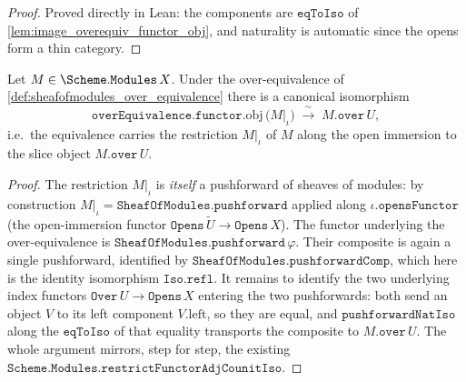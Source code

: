 \begin{proof}
  \leanok
  Proved directly in Lean: the components are \(\mathtt{eqToIso}\) of
  \cref{lem:image_overequiv_functor_obj}, and naturality is automatic since the opens
  form a thin category.
\end{proof}

\begin{lemma}\leanok
  \label{lem:sheafofmodules_restrict_over_iso}
  Let \(M \in \Scheme.\mathtt{Modules}\,X\). Under the over-equivalence of
  \cref{def:sheafofmodules_over_equivalence} there is a canonical isomorphism
  \[
    \mathtt{overEquivalence}.\mathtt{functor}.\mathrm{obj}\,\bigl(M|_\iota\bigr)
      \;\xrightarrow{\ \sim\ }\;
    M.\mathtt{over}\,U,
  \]
  i.e.\ the equivalence carries the restriction \(M|_\iota\) of \(M\) along the
  open immersion to the slice object \(M.\mathtt{over}\,U\).
\end{lemma}

\begin{proof}
  \leanok
  The restriction \(M|_\iota\) is \emph{itself} a pushforward of sheaves of
  modules: by construction \(M|_\iota = \mathtt{SheafOfModules.pushforward}\)
  applied along \(\iota.\mathtt{opensFunctor}\) (the open-immersion functor
  \(\mathtt{Opens}\,\widetilde{U} \to \mathtt{Opens}\,X\)). The functor underlying
  the over-equivalence is \(\mathtt{SheafOfModules.pushforward}\,\varphi\). Their
  composite is again a single pushforward, identified by
  \(\mathtt{SheafOfModules.pushforwardComp}\), which here is the identity
  isomorphism \(\mathtt{Iso.refl}\). It remains to identify the two underlying
  index functors \(\mathtt{Over}\,U \to \mathtt{Opens}\,X\) entering the two
  pushforwards: both send an object \(V\) to its left component \(V.\mathrm{left}\),
  so they are equal, and \(\mathtt{pushforwardNatIso}\) along the \(\mathtt{eqToIso}\)
  of that equality transports the composite to \(M.\mathtt{over}\,U\). The whole
  argument mirrors, step for step, the existing
  \(\mathtt{Scheme.Modules.restrictFunctorAdjCounitIso}\).
\end{proof}


